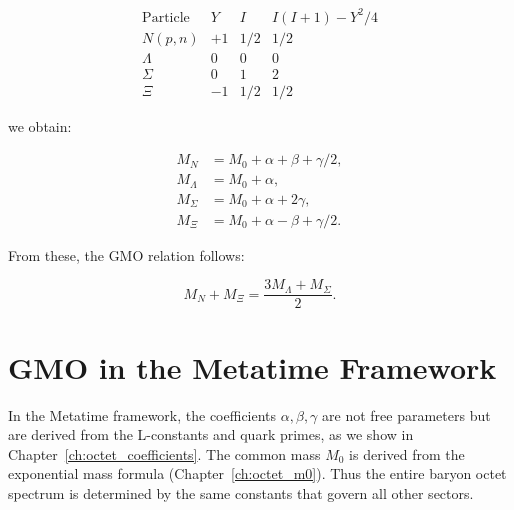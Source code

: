 \[
\begin{array}{lccc}
\text{Particle} & Y & I & I(I+1) - Y^2/4 \\
\hline
N (p,n) & +1 & 1/2 & 1/2 \\
\Lambda & 0 & 0 & 0 \\
\Sigma & 0 & 1 & 2 \\
\Xi & -1 & 1/2 & 1/2
\end{array}
\]

we obtain:

\[
\begin{aligned}
M_N &= M_0 + \alpha + \beta + \gamma/2, \\
M_\Lambda &= M_0 + \alpha, \\
M_\Sigma &= M_0 + \alpha + 2\gamma, \\
M_\Xi &= M_0 + \alpha - \beta + \gamma/2.
\end{aligned}
\]

From these, the GMO relation follows:

\[
M_N + M_\Xi = \frac{3M_\Lambda + M_\Sigma}{2}.
\]

\section{GMO in the Metatime Framework}

In the Metatime framework, the coefficients \(\alpha, \beta, \gamma\) are not
free parameters but are derived from the L-constants and quark primes, as we
show in Chapter~\ref{ch:octet_coefficients}.  The common mass \(M_0\) is
derived from the exponential mass formula (Chapter~\ref{ch:octet_m0}).
Thus the entire baryon octet spectrum is determined by the same constants
that govern all other sectors.
